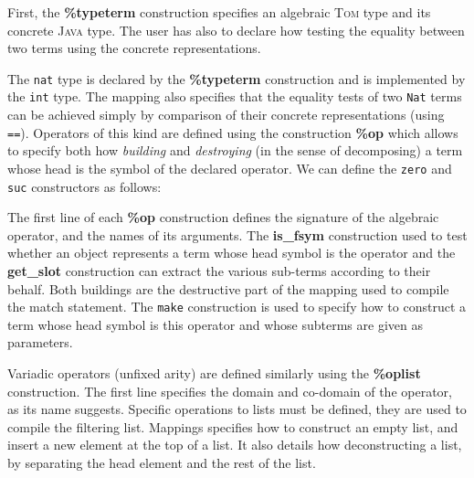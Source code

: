 \documentclass[runningheads]{llncs}
\newcommand{\tom}{\textsc{Tom}}
\newcommand{\java}{\textsc{Java}}
\newcommand{\lex}[1]{{\textrm{\textbf{#1}}}}
\begin{document}
First, the \lex{\%typeterm} construction specifies an algebraic {\tom} type and
its concrete {\java} type. The user has also to declare how testing the
equality between two terms using the concrete representations.

\medskip
{}

The \texttt{nat} type is declared by the \lex{\%typeterm} construction and is
implemented by the \texttt{int} type. The mapping also specifies that the
equality tests of two \texttt{Nat} terms can be achieved simply by comparison
of their concrete representations (using \texttt{==}). Operators of this kind
are defined using the construction \lex{\%op} which allows to specify both how
\emph{building} and \emph{destroying} (in the sense of decomposing) a term
whose head is the symbol of the declared operator. We can define the
\texttt{zero} and \texttt{suc} constructors as follows:


	
The first line of each \lex{\%op} construction defines the signature of the
algebraic operator, and the names of its arguments. The \lex{is\_fsym}
construction used to test whether an object represents a term whose head symbol
is the operator and the \lex{get\_slot} construction can extract the various
sub-terms according to their behalf. Both buildings are the destructive part of
the mapping used to compile the match statement.  The \texttt{make} construction
is used to specify how to construct a term whose head symbol is this operator
and whose subterms are given as parameters.

Variadic operators (unfixed arity) are defined similarly using the
\lex{\%oplist} construction.  The first line specifies the domain and co-domain
of the operator, as its name suggests. Specific operations to lists must be
defined, they are used to compile the filtering list. Mappings specifies how to
construct an empty list, and insert a new element at the top of a list. It also
details how deconstructing a list, by separating the head element and the rest
of the list.
\end{document}

